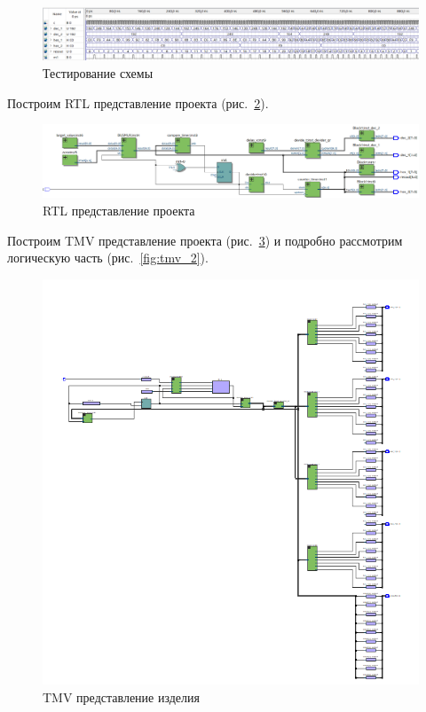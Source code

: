 \documentclass[a4paper,14pt]{article}
\begin{document}
\begin{figure}[H]
	\centering
	\includegraphics[width=\linewidth]{image/wave}
	\caption{Тестирование схемы}
	\label{fig:wave}
\end{figure}

Построим RTL представление проекта (рис.~\ref{fig:rtl}).

\begin{figure}[H]
	\centering
	\includegraphics[width=\linewidth]{image/rtl}
	\caption{RTL представление проекта}
	\label{fig:rtl}
\end{figure}

Построим TMV представление проекта (рис.~\ref{fig:tmv_1}) и подробно рассмотрим логическую часть (рис.~\ref{fig:tmv_2}).

\begin{figure}[H]
	\centering
	\includegraphics[width=\linewidth]{image/tmv_1}
	\caption{TMV представление изделия}
	\label{fig:tmv_1}
\end{figure}
\end{document}
